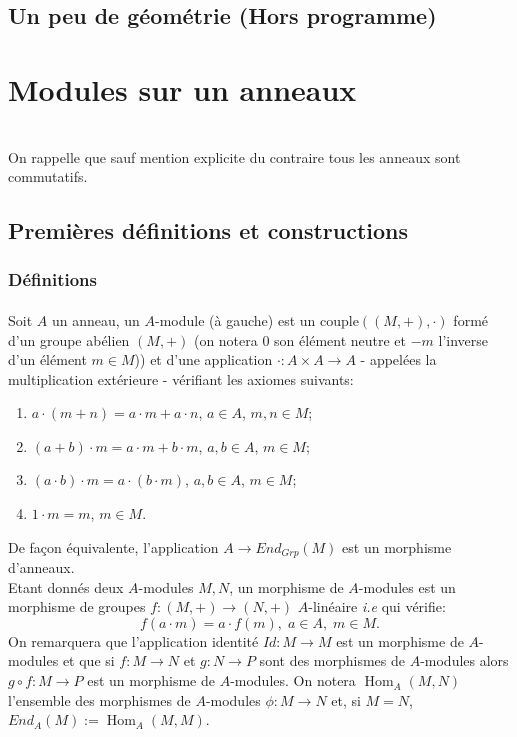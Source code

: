 \documentclass[a4paper, oneside, 12pt]{book}
\theoremstyle{theoremeStyle} %
\theoremstyle{definition} %
\DeclareMathOperator{\SHom}{Hom}
\begin{document}
 \chapter{Un peu de géométrie (Hors programme)}







\part{Modules sur un anneaux}
\textit{}\\
 On rappelle que sauf mention explicite du contraire tous les anneaux sont commutatifs.
\chapter{Premières définitions et constructions}
\section{Définitions}
\subsection{}Soit $A$ un anneau, un $A$-module (à gauche) est un couple$((M,+),\cdot)$ formé d'un groupe abélien  $(M,+)$ (on notera $0$ son élément neutre et $-m$ l'inverse d'un élément $m\in M$)) et d'une application $ \cdot :A\times A\rightarrow A$ - appelées la multiplication extérieure -  vérifiant les axiomes suivants:
\begin{enumerate}
\item $a\cdot (m+n)=a\cdot m+a\cdot n $, $a\in A$, $m,n\in M$;
\item $(a+b)\cdot m=a\cdot m+b\cdot m$, $a,b\in A$, $m\in M$;
\item $(a\cdot b)\cdot m=a\cdot (b\cdot m)$, $a,b\in A$, $m\in M$;
\item $1\cdot m=m$, $m\in M$. \\
\end{enumerate}
De fa\c{c}on équivalente, l'application $A\rightarrow End_{Grp}(M)$ est un morphisme d'anneaux.\\

 Etant donnés deux  $A$-modules $M,N$, un morphisme de $A$-modules est un morphisme de groupes $f:(M,+)\rightarrow (N,+)$   $A$-linéaire \textit{i.e} qui vérifie:
  $$f(a\cdot m)=a\cdot f(m),\; a\in A,\; m\in M.$$
On remarquera que l'application identité $Id:M\rightarrow M$ est un morphisme de $A$-modules et que si $f:M\rightarrow N$ et $g:N\rightarrow P$ sont des morphismes de $A$-modules alors $g\circ f:M\rightarrow P$ est un morphisme de $A$-modules. On notera $\SHom_A(M,N)$ l'ensemble des morphismes de $A$-modules $\phi:M\rightarrow N$ et, si $M=N$, $End_A(M):=\SHom_A(M,M)$. \\
\end{document}
